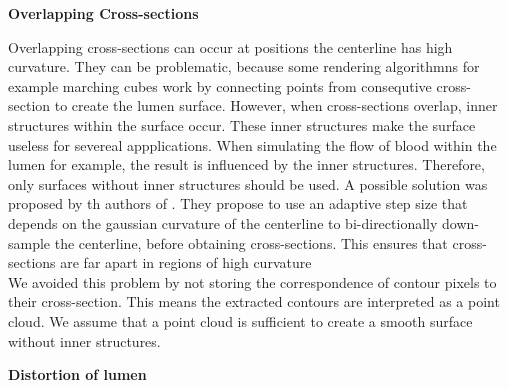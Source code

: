 \documentclass[thesis.tex]{subfiles}
\begin{document}
\textbf{Overlapping Cross-sections} 

Overlapping cross-sections can occur at positions the centerline has high curvature. They can be problematic, because some rendering algorithmns for example marching cubes work by connecting points from consequtive cross-section to create the lumen surface. However, when cross-sections overlap, inner structures within the surface occur. These inner structures make the surface useless for severeal appplications. When simulating the flow of blood within the lumen for example, the result is influenced by the inner structures. Therefore, only surfaces without inner structures should be used. A possible solution was proposed by th authors of \cite{wu2010curvature}. They propose to use an adaptive step size that depends on the gaussian curvature of the centerline to bi-directionally down-sample the centerline, before obtaining cross-sections. This ensures that cross-sections are far apart in regions of high curvature \\
We avoided this problem by not storing the correspondence of contour pixels to their cross-section. This means the extracted contours are interpreted as a point cloud. We assume that a point cloud is sufficient to create a smooth surface without inner structures.  

\textbf{Distortion of lumen} 
\end{document}
